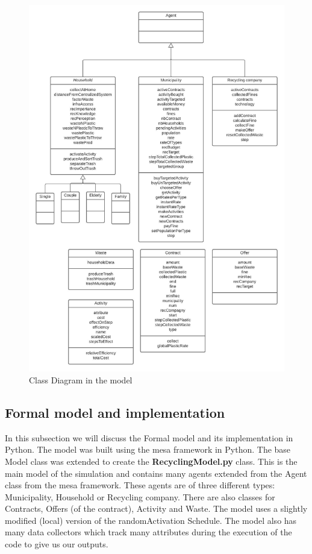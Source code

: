 \begin{figure}[H]
    \centering
        \captionsetup{width=\linewidth}
        \includegraphics[width=1.0\linewidth]{Images/UML for recycling system - Pagina 3.jpeg}
        \caption{Class Diagram in the model}
    \label{fig:Class-Diagram}
\end{figure}

\subsection{Formal model and implementation}
\noindent In this subsection we will discuss the Formal model and its implementation in Python. The model was built using the mesa \cite{Mesa} framework in Python. The base Model class was extended to create the \textbf{RecyclingModel.py} class. This is the main model of the simulation and contains many agents extended from the Agent class from the mesa framework. These agents are of three different types: Municipality, Household or Recycling company. There are also classes for Contracts, Offers (of the contract), Activity and Waste. The model uses a slightly modified (local) version of the randomActivation Schedule. The model also has many data collectors which track many attributes during the execution of the code to give us our outputs.\\

